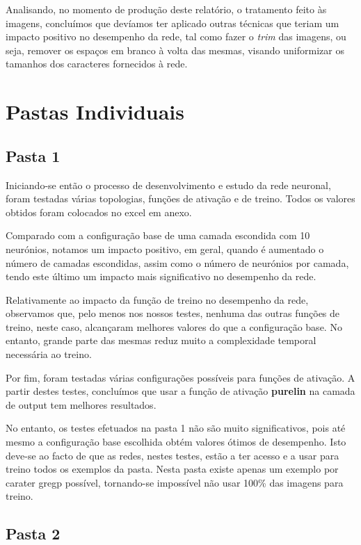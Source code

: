 \documentclass[11pt]{article}
\begin{document}
	Analisando, no momento de produção deste relatório, o tratamento feito às imagens, concluímos que devíamos ter aplicado outras técnicas que teriam um impacto positivo no desempenho da rede, tal como fazer o \textit{trim} das imagens, ou seja, remover os espaços em branco à volta das mesmas, visando uniformizar os tamanhos dos caracteres fornecidos à rede.

	\pagebreak
	
	\large
	\section{Pastas Individuais}
	\subsection{Pasta 1}
	\normalsize
	
	Iniciando-se então o processo de desenvolvimento e estudo da rede neuronal, foram testadas várias topologias, funções de ativação e de treino. Todos os valores obtidos foram colocados no excel em anexo.
	
	Comparado com a configuração base de uma camada escondida com 10 neurónios, notamos um impacto positivo, em geral, quando é aumentado o número de camadas escondidas, assim como o número de neurónios por camada, tendo este último um impacto mais significativo no desempenho da rede.
	
	Relativamente ao impacto da função de treino no desempenho da rede, observamos que, pelo menos nos nossos testes, nenhuma das outras funções de treino, neste caso, alcançaram melhores valores do que a configuração base. No entanto, grande parte das mesmas reduz muito a complexidade temporal necessária ao treino.
	
	Por fim, foram testadas várias configurações possíveis para funções de ativação. A partir destes testes, concluímos que usar a função de ativação \textbf{purelin} na camada de output tem melhores resultados.
	
	No entanto, os testes efetuados na pasta 1 não são muito significativos, pois até mesmo a configuração base escolhida obtém valores ótimos de desempenho. Isto deve-se ao facto de que as redes, nestes testes, estão a ter acesso e a usar para treino todos os exemplos da pasta. Nesta pasta existe apenas um exemplo por carater gregp possível, tornando-se impossível não usar 100\% das imagens para treino.
	
	\pagebreak
	
	
	\large
	\subsection{Pasta 2}
	\normalsize
	
\end{document}
